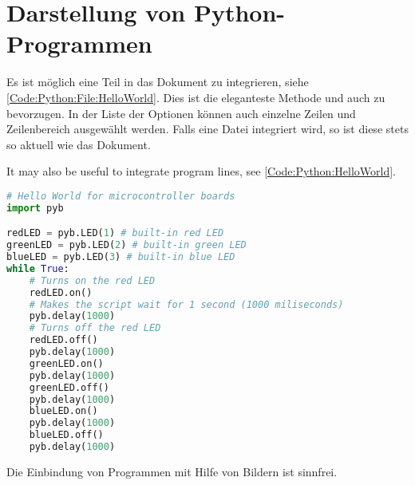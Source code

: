 %
%

\chapter{Darstellung von Python-Programmen}


Es ist möglich eine Teil in das Dokument zu integrieren, siehe \ref{Code:Python:File:HelloWorld}. Dies ist die eleganteste Methode und auch zu bevorzugen. In der Liste der Optionen können auch einzelne Zeilen und Zeilenbereich ausgewählt werden. Falls eine Datei integriert wird, so ist diese stets so aktuell wie das Dokument.


\begin{code}
      
    
  \caption[\glqq Hello World\grqq{} in Python -- Variante 1]{Das Programm ``Hallo World'' in Python für Mikrocontroller-Boards wird aus der Datei  eingefügt.}\label{Code:Python:File:HelloWorld}    
\end{code}    

It may also be useful to integrate program lines, see \ref{Code:Python:HelloWorld}.



\lstset{caption=Some Code}
\begin{code}
  \begin{lstlisting}[language=python]
# Hello World for microcontroller boards
import pyb

redLED = pyb.LED(1) # built-in red LED
greenLED = pyb.LED(2) # built-in green LED
blueLED = pyb.LED(3) # built-in blue LED
while True:
    # Turns on the red LED
    redLED.on()
    # Makes the script wait for 1 second (1000 miliseconds)
    pyb.delay(1000)
    # Turns off the red LED
    redLED.off()
    pyb.delay(1000)
    greenLED.on()
    pyb.delay(1000)
    greenLED.off()
    pyb.delay(1000)
    blueLED.on()
    pyb.delay(1000)
    blueLED.off()
    pyb.delay(1000)
\end{lstlisting}      

  \caption[\glqq Hello World\grqq{} in Python -- Variante 2]{Das Programm ``Hello World'' in Python für Mikrocontroller-Boards wurde direkt in die \LaTeX{}-Datei eingefügt.}\label{Code:Python:HelloWorld}    
\end{code}    

Die Einbindung von Programmen mit Hilfe von Bildern ist sinnfrei.